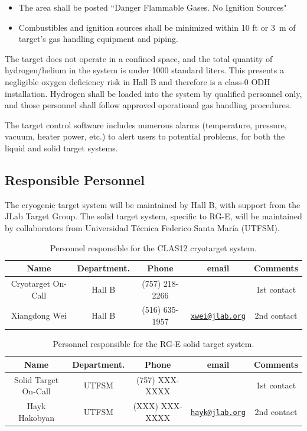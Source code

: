 \begin{itemize}
\item The area shall be posted ``Danger Flammable Gases. No Ignition Sources" 
\item Combustibles and ignition sources shall be minimized within 10 ft or 3~m of target’s gas handling equipment and piping.
\end{itemize}

The target does not operate in a confined space, and the total quantity of hydrogen/helium in the system is under 1000 standard liters. This presents a negligible oxygen deficiency risk in Hall B and therefore is a class-0 ODH installation.  Hydrogen shall be loaded into the system by qualified personnel only, and those personnel shall follow approved operational gas handling procedures.

The target control software includes numerous alarms (temperature, pressure, vacuum, heater power, etc.) to alert users to potential problems, for both the liquid and solid target systems.

\subsection{Responsible Personnel}

The cryogenic target system will be maintained by Hall B, with support from the JLab Target Group.   The solid target system, specific to RG-E, will be maintained by collaborators from Universidad T\'{e}cnica Federico Santa Mar\'{i}a (UTFSM).

\begin{table}[!htb]
\centering
\begin{tabular}{|c|c|c|c|c|}
\hline
 Name&Department.&Phone&email&Comments \\ \hline
Cryotarget On-Call & Hall B &(757) 218-2266& &1st contact \\ \hline
Xiangdong Wei & Hall B &(516) 635-1957&\href{mailto:xwei@jlab.org}{\nolinkurl{xwei@jlab.org}} &2nd contact \\ \hline
\end{tabular}
\caption{Personnel responsible for the CLAS12 cryotarget system.} 
\label{tb:target}
\end{table}

\begin{table}[!htb]
\centering
\begin{tabular}{|c|c|c|c|c|}
\hline
 Name&Department.&Phone&email&Comments \\ \hline
Solid Target On-Call & UTFSM &(757) XXX-XXXX& &1st contact \\ \hline
Hayk Hakobyan & UTFSM &(XXX) XXX-XXXX&\href{mailto:hayk@jlab.org}{\nolinkurl{hayk@jlab.org}} &2nd contact \\ \hline
\end{tabular}
\caption{Personnel responsible for the RG-E solid target system.} 
\label{tb:starget}
\end{table}

